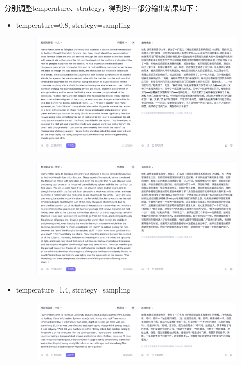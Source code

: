 \documentclass{article}%
\begin{document}
分别调整temperature、strategy，得到的一部分输出结果如下：
\begin{itemize}
    \item temperature=0.8, strategy=sampling
    \begin{figure}[H]
        \centering
        \includegraphics[width=0.9\linewidth]{../output/output2.png}
    \end{figure}
    \begin{figure}[H]
        \centering
        \includegraphics[width=0.9\linewidth]{../output/output3.png}
    \end{figure}        
    \item temperature=1.4, strategy=sampling
    \begin{figure}[H]
        \centering
        \includegraphics[width=0.9\linewidth]{../output/output4.png}
    \end{figure}

\end{itemize}
\end{document}
